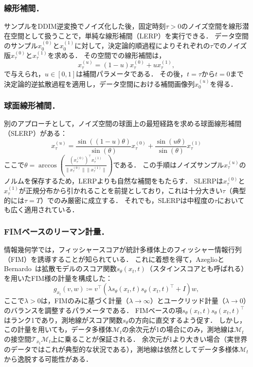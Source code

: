 \documentclass[MIRU,submit]{miru2026j}
\theoremstyle{definition}
\newcommand{\gM}{{\mathcal{M}}}
\newcommand{\gT}{{\mathcal{T}}}
\newcommand{\sss}[1]{{\scriptscriptstyle (#1)}}
\begin{document}
\subsubsection{線形補間．}
サンプルをDDIM逆変換でノイズ化した後，固定時刻$\tau>0$のノイズ空間を線形潜在空間として扱うことで，単純な線形補間（LERP）\cite{Ho2020}を実行できる．
データ空間のサンプル$x_0^\sss{0}$と$x_0^\sss{1}$に対して，決定論的順過程によりそれぞれの$\tau$でのノイズ版$x_\tau^\sss{0}$と$x_\tau^\sss{1}$を求める．
その空間での線形補間は，
\begin{equation}
    {x}_\tau^\sss{u}=(1-u)x_\tau^\sss{0}+u x_\tau^\sss{1},
\end{equation}
で与えられ，$u\in[0,1]$は補間パラメータである．
その後，$t=\tau$から$t=0$まで決定論的逆拡散過程を適用し，データ空間における補間画像列$x_0^\sss{u}$を得る．

\subsubsection{球面線形補間．}
別のアプローチとして，ノイズ空間の球面上の最短経路を求める球面線形補間（SLERP）\cite{Song2021a}がある：
\begin{equation}
    x_\tau^\sss{u}=\frac{\sin((1-u)\theta)}{\sin{(\theta)}}x_\tau^\sss{0}+\frac{\sin(u\theta)}{\sin{(\theta)}}x_\tau^\sss{1}
\end{equation}
ここで$\theta=\arccos\left({\frac{(x_\tau^\sss{0})^\top x_\tau^\sss{1}}{\|x_\tau^\sss{0}\| \|x_\tau^\sss{1}\|}}\right)$である．
この手順はノイズサンプル$x_\tau^\sss{u}$のノルムを保存するため，LERPよりも自然な補間をもたらす．
SLERPは$x_\tau^\sss{0}$と$x_\tau^\sss{1}$が正規分布から引かれることを前提としており，これは十分大きい$\tau$（典型的には$\tau=T$）でのみ厳密に成立する．
それでも，SLERPは中程度の$\tau$においても広く適用されている．

\subsubsection{FIMベースのリーマン計量．}
情報幾何学では，フィッシャースコアが統計多様体上のフィッシャー情報行列（FIM）を誘導することが知られている．
これに着想を得て，AzeglioとBernardo~\cite{Azeglio2025}は拡散モデルのスコア関数$s_\theta(x_t,t)$（スタインスコアとも呼ばれる）を用いたFIM様の計量を構成した：
\begin{equation}
    \label{eq:FIM-based_metric}
    \textstyle
    g_{x_t}(v, w) \coloneq v^\top (\lambda s_{\theta}(x_t,t) s_\theta(x_t,t)^\top + I) w,
\end{equation}
ここで$\lambda>0$は，FIMのみに基づく計量（$\lambda \to \infty$）とユークリッド計量（$\lambda \to 0$）のバランスを調整するパラメータである．
FIMベースの項$s_{\theta}(x_t,t) s_\theta(x_t,t)^\top$はランク1であり，測地線がスコア関数$s_\theta$の方向に直交するよう促す．
しかし，この計量を用いても，データ多様体$\gM_t$の余次元が1の場合にのみ，測地線は$\gM_t$の接空間$\gT_{x_t}\gM_t$上に乗ることが保証される．
余次元が1より大きい場合（実世界のデータではこれが典型的な状況である），測地線は依然としてデータ多様体$\gM_t$から逸脱する可能性がある．
\end{document}
